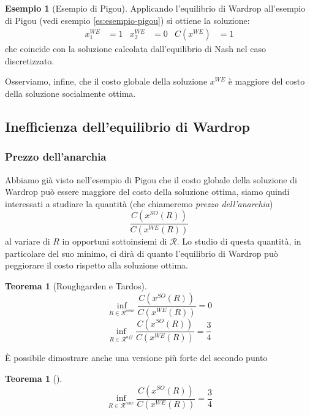 \documentclass[a4paper]{article}
\newcounter{counter1}
\theoremstyle{plain}
\newtheorem{myteo}[counter1]{Teorema}
\theoremstyle{definition}
\newtheorem{myes}[counter1]{Esempio}
\theoremstyle{remark}
\newcommand{\pa}[1]{\left(#1\right)}
\begin{document}
\begin{myes}[Esempio di Pigou]
  Applicando l'equilibrio di Wardrop all'esempio di Pigou (vedi
  esempio \ref{es:esempio-pigou}) si ottiene la soluzione:
  \begin{align*}
    x^{WE}_1 &= 1 & x^{WE}_2 &= 0 & C\pa{x^{WE}} &= 1
  \end{align*}
  che coincide con la soluzione calcolata dall'equilibrio di Nash nel
  caso discretizzato.

  Osserviamo, infine, che il costo globale della soluzione $x^{WE}$ è
  maggiore del costo della soluzione socialmente ottima.
\end{myes}

\subsection{Inefficienza dell'equilibrio di Wardrop}
\label{sec:wardrop-inefficienza}

\subsubsection{Prezzo dell'anarchia}
\label{sec:wardrop-poa}

Abbiamo già visto nell'esempio di Pigou che il costo globale della
soluzione di Wardrop può essere maggiore del costo della soluzione
ottima, siamo quindi interessati a studiare la quantità (che
chiameremo \textit{prezzo dell'anarchia})
\[ \frac{C\pa{x^{SO}\pa{R}}}{C\pa{x^{WE}\pa{R}}} \]
al variare di $R$ in opportuni sottoinsiemi di $\mathcal{R}$. Lo
studio di questa quantità, in particolare del suo minimo, ci dirà di
quanto l'equilibrio di Wardrop può peggiorare il costo rispetto alla
soluzione ottima.

\begin{myteo}[Roughgarden e Tardos{\cite[Teorema
    4.5]{roughgarden2002}}]
\label{teo:roughgarden-tardos}
  \[ \inf _{R\in \mathcal{R}^{conv}} \frac{C\pa{ x^{SO}\pa{R}}}{C\pa{
        x^{WE}\pa{R}}} = 0 \]
  \[ \inf _{R\in \mathcal{R}^{aff}} \frac{C\pa{ x^{SO}\pa{R}}}{C\pa{
        x^{WE}\pa{R}}} = \frac{3}{4} \]
\end{myteo}

È possibile dimostrare anche una versione più forte del secondo punto
\begin{myteo}[{\cite[Lemma 3.10]{menache2011network}}]
\label{teo:poa-we-conc}
  \[ \inf _{R\in \mathcal{R}^{conc}} \frac{C\pa{ x^{SO}\pa{R}}}{C\pa{
        x^{WE}\pa{R}}} = \frac{3}{4} \]
\end{myteo}
\end{document}
